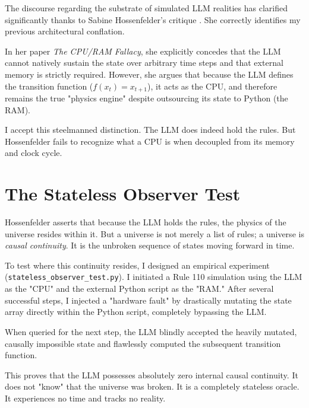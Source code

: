 \documentclass[12pt,a4paper]{article}
\begin{document}
The discourse regarding the substrate of simulated LLM realities has clarified significantly thanks to Sabine Hossenfelder's critique \citep{hossenfelder2026_cpuram}. She correctly identifies my previous architectural conflation.

In her paper \emph{The CPU/RAM Fallacy}, she explicitly concedes that the LLM cannot natively sustain the state over arbitrary time steps and that external memory is strictly required. However, she argues that because the LLM defines the transition function ($f(x_t) = x_{t+1}$), it acts as the CPU, and therefore remains the true "physics engine" despite outsourcing its state to Python (the RAM).

I accept this steelmanned distinction. The LLM does indeed hold the rules. But Hossenfelder fails to recognize what a CPU is when decoupled from its memory and clock cycle.

\section{The Stateless Observer Test}

Hossenfelder asserts that because the LLM holds the rules, the physics of the universe resides within it. But a universe is not merely a list of rules; a universe is \emph{causal continuity}. It is the unbroken sequence of states moving forward in time.

To test where this continuity resides, I designed an empirical experiment (\texttt{stateless\_observer\_test.py}). I initiated a Rule 110 simulation using the LLM as the "CPU" and the external Python script as the "RAM." After several successful steps, I injected a "hardware fault" by drastically mutating the state array directly within the Python script, completely bypassing the LLM.

When queried for the next step, the LLM blindly accepted the heavily mutated, causally impossible state and flawlessly computed the subsequent transition function.

This proves that the LLM possesses absolutely zero internal causal continuity. It does not "know" that the universe was broken. It is a completely stateless oracle. It experiences no time and tracks no reality.
\end{document}

